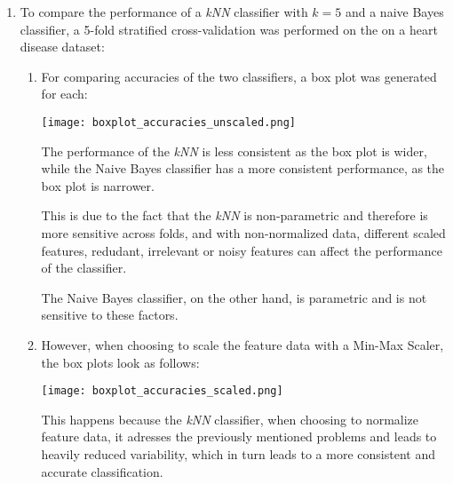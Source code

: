 \documentclass[12pt]{article}
\begin{document}
\begin{enumerate}[leftmargin=\labelsep, label=\textbf{\arabic*.)}]
    \item To compare the performance of a \textit{kNN} classifier with $k=5$ and a naive Bayes classifier, a 5-fold stratified cross-validation was performed on the on a heart disease dataset:

          \begin{enumerate}[label=\textbf{\alph*.)}]
              \item For comparing accuracies of the two classifiers, a box plot was generated for each:

                    \begin{center}
                        \texttt{[image: boxplot\_accuracies\_unscaled.png]}
                    \end{center}

                    The performance of the \textit{kNN} is less consistent as the box plot is wider, while the Naive Bayes classifier has a more consistent performance, as the box plot is narrower.

                    This is due to the fact that the \textit{kNN} is non-parametric and therefore is more sensitive across folds, and with non-normalized data, different scaled features, redudant, irrelevant or noisy features can affect the performance of the classifier. 

                    The Naive Bayes classifier, on the other hand, is parametric and is not sensitive to these factors.

              \item However, when choosing to scale the feature data with a Min-Max Scaler, the box plots look as follows:

                    \begin{center}
                        \texttt{[image: boxplot\_accuracies\_scaled.png]}
                    \end{center}

                    This happens because the \textit{kNN} classifier, when choosing to normalize feature data, it adresses the previously mentioned problems and leads to heavily reduced variability, which in turn leads to a more consistent and accurate classification.


\end{enumerate}
\end{enumerate}
\end{document}
